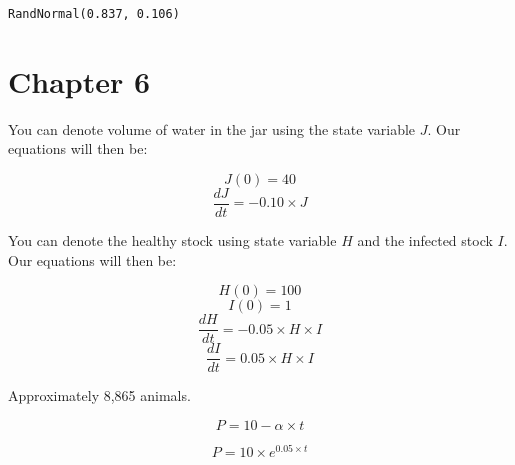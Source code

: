 \documentclass[]{memoir}
\begin{document}
\lstinline!RandNormal(0.837, 0.106)!

\section{Chapter 6}


You can denote volume of water in the jar using the state variable $J$.
Our equations will then be:

\[ J(0) = 40 \] \[ \frac{dJ}{dt} = -0.10 \times J\]


You can denote the healthy stock using state variable $H$ and the
infected stock $I$. Our equations will then be:

\[ H(0) = 100 \] \[ I(0) = 1 \]
\[ \frac{dH}{dt} = -0.05 \times H \times I \]
\[ \frac{dI}{dt} = 0.05 \times H \times I \]


Approximately 8,865 animals.


\[ P = 10 - \alpha \times t\]


\[ P = 10 \times e^{0.05\times t}\]

\end{document}
